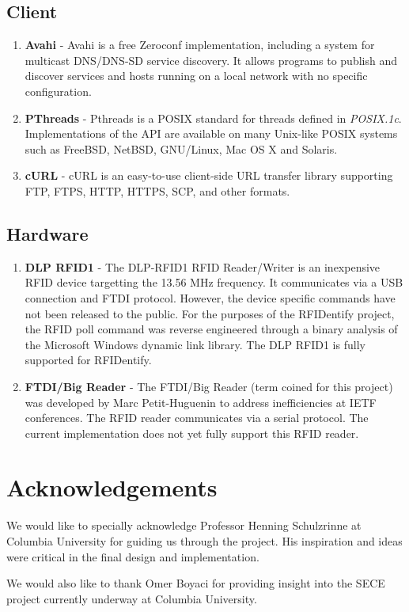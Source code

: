 \documentclass{article}
\begin{document}
	\subsection{Client}
	\begin{enumerate}
		\item	\textbf { Avahi } -
                  Avahi is a free Zeroconf implementation, including a system for multicast DNS/DNS-SD service discovery.
                  It allows programs to publish and discover services and hosts running on a local network 
                  with no specific configuration.

		\item	\textbf { PThreads } -
                  Pthreads is a POSIX standard for threads defined in \textit{POSIX.1c}. 
                  Implementations of the API are available on many Unix-like POSIX systems such as 
                  FreeBSD, NetBSD, GNU/Linux, Mac OS X and Solaris.

		\item	\textbf { cURL } -
                  cURL is an easy-to-use client-side URL transfer library supporting 
                  FTP, FTPS, HTTP, HTTPS, SCP, and other formats.
	\end{enumerate}

	\subsection{Hardware}
	\begin{enumerate}
		\item  { \bf DLP RFID1} -
                  The DLP-RFID1 RFID Reader/Writer is an inexpensive RFID device targetting the 13.56 MHz frequency.
                  It communicates via a USB connection and FTDI protocol. However, the device specific commands
                  have not been released to the public.  For the purposes of the RFIDentify project, the RFID poll
                  command was reverse engineered through a binary analysis of the Microsoft Windows dynamic link library.
                  The DLP RFID1 is fully supported for RFIDentify.

		\item  { \bf FTDI/Big Reader } -
                  The FTDI/Big Reader (term coined for this project) was developed by 
                  Marc Petit-Huguenin to address inefficiencies at IETF conferences.  The RFID
                  reader communicates via a serial protocol. The current implementation does
                  not yet fully support this RFID reader.
	\end{enumerate}
		

\section{Acknowledgements}

We would like to specially acknowledge Professor Henning Schulzrinne at Columbia University for guiding us through the
project. His inspiration and ideas were critical in the final design and implementation.

We would also like to thank Omer Boyaci for providing insight into the SECE project currently underway at Columbia University.
\end{document}
